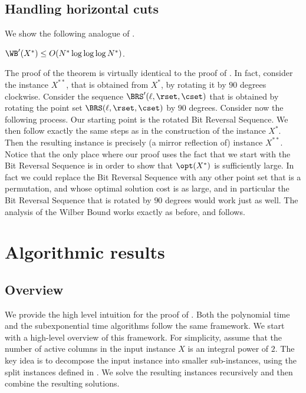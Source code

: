 %
%
%
%
\subsection{Handling horizontal cuts}\label{subsec: bounding WB horizontal}
%
%
%
%
We show the following analogue of .

\begin{theorem}\label{thm: boundinb WB horizontal}
	$\WB'(X^*)\leq O(N^*\log\log\log N^*)$.
\end{theorem}

The proof of the theorem is virtually identical to the proof of . 
In fact, consider the instance $X^{**}$, that is obtained from $X^*$, by rotating it by $90$ degrees clockwise.
Consider the sequence $\BRS'(\ell, \rset, \cset)$ that is obtained by rotating the point set $\BRS(\ell, \rset, \cset)$ by $90$ degrees.  
%
Consider now the following process. Our starting point is the rotated Bit Reversal Sequence. We then follow exactly the same steps as in the construction of the instance $X^*$. 
Then the resulting instance is precisely (a mirror reflection of) instance $X^{**}$.
Notice that the only place where our proof uses the fact that we start with the Bit Reversal Sequence is in order to show that $\opt(X^*)$ is sufficiently large. In fact we could replace the Bit Reversal Sequence with any other point set that is a permutation, and whose optimal solution cost is as large, and in particular the Bit Reversal Sequence that is rotated by $90$ degrees would work just as well. The analysis of the Wilber Bound works exactly as before, and  follows.




%

\section{Algorithmic results} 
\label{sec: algo} 
\newcommand{\pedit}[1]{\textcolor{red}{#1}}

\subsection{Overview} 

We provide the high level intuition for the proof of . Both the polynomial time and the subexponential time algorithms follow the same framework. We start with a high-level overview of this framework. For simplicity, assume that the number of active columns in the input instance $X$ is an integral power of $2$.
The key idea is to decompose the input instance into smaller sub-instances,  using the split instances defined in . We solve the resulting instances recursively and then combine the resulting solutions.

